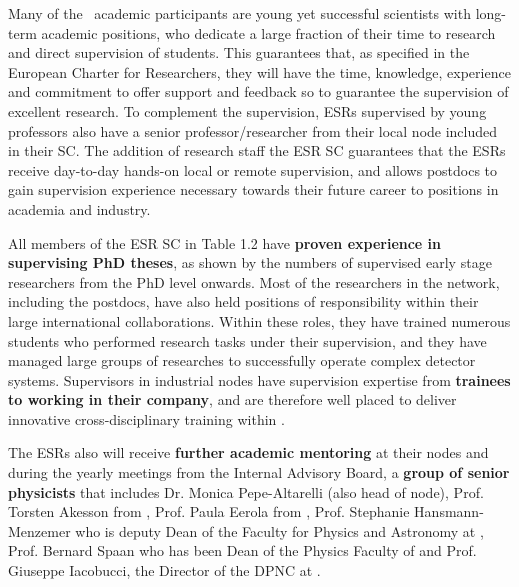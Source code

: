 Many of the \acronym\ academic participants are young yet successful scientists with long-term academic positions, who dedicate a large fraction of their time to research and direct supervision of students. 
This guarantees that, as specified in the European Charter for Researchers, they will have the time, knowledge, experience and commitment to offer support and feedback so to guarantee the supervision of excellent research. 
To complement the supervision, ESRs supervised by young professors also have a senior professor/researcher from their local node included in their SC.
The addition of research staff the ESR SC guarantees that the ESRs receive day-to-day hands-on local or remote supervision, and allows \acronym postdocs to gain supervision experience necessary towards their future career to positions in academia and industry. 

All members of the ESR SC in Table 1.2 have \textbf{proven experience in supervising PhD theses}, as shown by the numbers of supervised early stage researchers from the PhD level onwards. 
Most of the researchers in the network, including the postdocs, have also held positions of responsibility within their large international collaborations. 
Within these roles, they have trained numerous students who performed research tasks under their supervision, and they have managed large groups of researches to successfully operate complex detector systems. 
Supervisors in industrial nodes have supervision expertise from \textbf{trainees to working in their company}, and are therefore well placed to deliver innovative cross-disciplinary training within \acronym. 

The ESRs also will receive \textbf{further academic mentoring} at their nodes and during the yearly meetings from the Internal Advisory Board, a \textbf{group of senior physicists} that includes Dr. Monica Pepe-Altarelli (also head of \cern node), Prof. Torsten Akesson from \lundentity, Prof. Paula Eerola from \helsinkientity, Prof. Stephanie Hansmann- Menzemer who is deputy Dean of the Faculty for Physics and Astronomy at \heidelbergentity, Prof. Bernard Spaan who has been Dean of the Physics Faculty of \dortmund and Prof. Giuseppe Iacobucci, the Director of the DPNC at \unigeentity. 


\vskip-10pt

